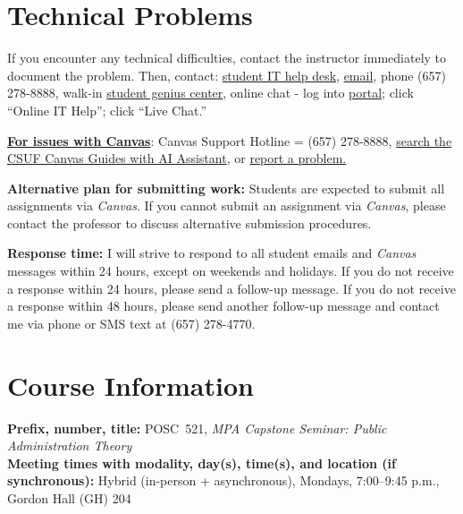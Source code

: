 \documentclass[11pt]{article}     %
\newcommand{\CourseCode}{POSC\ 521}
\newcommand{\CourseTitle}{MPA Capstone Seminar: Public Administration Theory}
\begin{document}
\section*{Technical Problems}
If you encounter any technical difficulties, contact the instructor immediately to document the problem. Then, contact: \href{http://www.fullerton.edu/it/students/helpdesk/index.php}{student IT help desk}, \href{mailto:StudentITHelpDesk@fullerton.edu}{email}, phone (657) 278-8888, walk-in \href{http://www.fullerton.edu/it/students/sgc/index.php}{student genius center}, online chat - log into \href{http://my.fullerton.edu}{portal}; click ``Online IT Help''; click ``Live Chat.''

\vspace{0.5em}
\noindent \textbf{\underline{For issues with Canvas}}: Canvas Support Hotline = (657) 278-8888, \href{https://canvashelp.fullerton.edu/}{search the CSUF Canvas Guides with AI Assistant}, or \href{https://titans.service-now.com/sp?id=sc_cat_item&sys_id=f88efe80ebea6a10fb7cfcffcad0cdc6&subject=Canvas}{report a problem.}

\vspace{0.5em}
\noindent \textbf{Alternative plan for submitting work:} Students are expected to submit all assignments via \emph{Canvas}. If you cannot submit an assignment via \emph{Canvas}, please contact the professor to discuss alternative submission procedures.

\vspace{0.5em}
\noindent \textbf{Response time:} I will strive to respond to all student emails and \emph{Canvas} messages within 24 hours, except on weekends and holidays. If you do not receive a response within 24 hours, please send a follow-up message. If you do not receive a response within 48 hours, please send another follow-up message and contact me via phone or SMS text at (657) 278-4770.

\section*{Course Information}
\noindent \textbf{Prefix, number, title:} \CourseCode, \textit{\CourseTitle} \\
\noindent \textbf{Meeting times with modality, day(s), time(s), and location (if synchronous):} Hybrid (in-person + asynchronous), Mondays, 7:00--9:45 p.m., Gordon Hall (GH) 204
\end{document}

